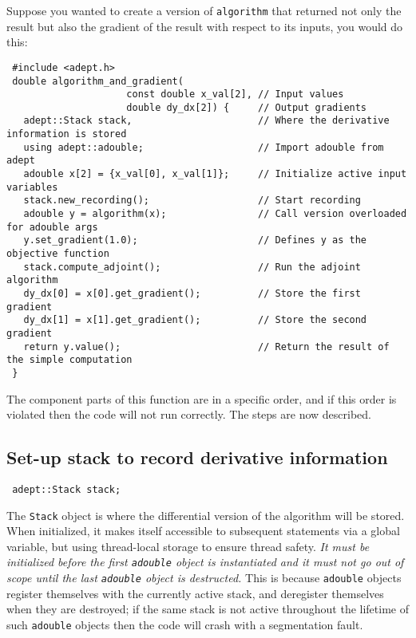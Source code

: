 \documentclass[a4,oneside]{book}
\def\codesize{\small}
\def\code#1{{\codesize\texttt{#1}}}
\begin{document}
Suppose you wanted to create a version of \code{algorithm} that
returned not only the result but also the gradient of the result with
respect to its inputs, you would do this:

\begin{lstlisting}
 #include <adept.h>
 double algorithm_and_gradient(
                     const double x_val[2], // Input values
                     double dy_dx[2]) {     // Output gradients
   adept::Stack stack,                      // Where the derivative information is stored
   using adept::adouble;                    // Import adouble from adept
   adouble x[2] = {x_val[0], x_val[1]};     // Initialize active input variables
   stack.new_recording();                   // Start recording
   adouble y = algorithm(x);                // Call version overloaded for adouble args
   y.set_gradient(1.0);                     // Defines y as the objective function 
   stack.compute_adjoint();                 // Run the adjoint algorithm
   dy_dx[0] = x[0].get_gradient();          // Store the first gradient
   dy_dx[1] = x[1].get_gradient();          // Store the second gradient
   return y.value();                        // Return the result of the simple computation
 }
\end{lstlisting}
%
The component parts of this function are in a specific order, and if
this order is violated then the code will not run correctly. The steps
are now described.
%
\subsection{Set-up stack to record derivative information}
\label{sec:stack_setup}
\begin{lstlisting}
 adept::Stack stack;
\end{lstlisting}
The \code{Stack} object is where the differential version of the
algorithm will be stored. When initialized, it makes itself accessible
to subsequent statements via a global variable, but using thread-local
storage to ensure thread safety. \emph{It must be initialized before
  the first \code{adouble} object is instantiated and it must not go
  out of scope until the last \code{adouble} object is destructed.}
This is because \code{adouble} objects register themselves with the
currently active stack, and deregister themselves when they are
destroyed; if the same stack is not active throughout the lifetime of
such \code{adouble} objects then the code will crash with a
segmentation fault.
\end{document}
